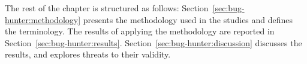 
The rest of the chapter is structured as follows:
Section~\ref{sec:bug-hunter:methodology} presents the methodology used in the studies and defines the terminology. 
The results of applying the methodology are reported in Section~\ref{sec:bug-hunter:results}.
Section~\ref{sec:bug-hunter:discussion} discusses the results, and explores threats to their validity.



